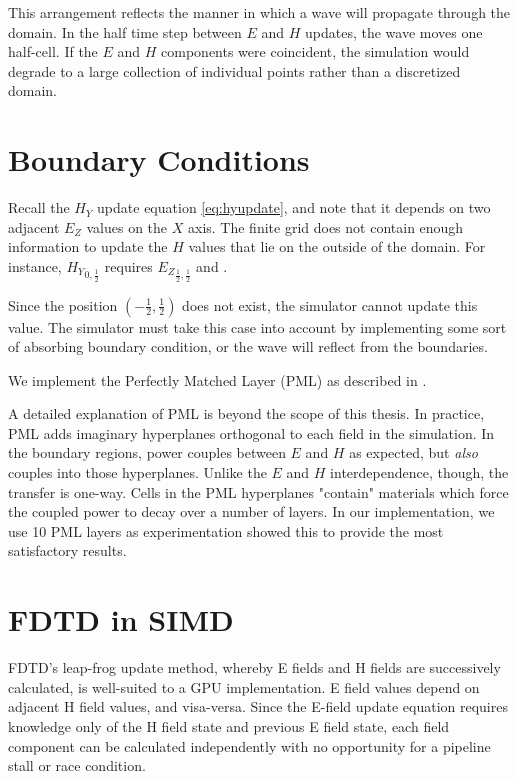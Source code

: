 This arrangement reflects the manner in which a wave will propagate through the domain. In the half time step between $E$ and $H$ updates, the wave moves one half-cell. If the $E$ and $H$ components were coincident, the simulation would degrade to a large collection of individual points rather than a discretized domain.


\section{Boundary Conditions}

Recall the $H_Y$ update equation \autoref{eq:hyupdate}, and note that it depends on two adjacent $E_Z$ values on the $X$ axis. The finite grid does not contain enough information to update the $H$ values that lie on the outside of the domain. For instance, ${H_Y}_{0,\frac{1}{2}}$ requires ${E_Z}_{\frac{1}{2},\frac{1}{2}}$ and .

Since the position $(-\frac{1}{2},\frac{1}{2})$ does not exist, the simulator cannot update this value. The simulator must take this case into account by implementing some sort of absorbing boundary condition, or the wave will reflect from the boundaries. 

We implement the Perfectly Matched Layer (PML) as described in \cite{BERENGER1994185}. 

A detailed explanation of PML is beyond the scope of this thesis. In practice, PML adds imaginary hyperplanes orthogonal to each field in the simulation. In the boundary regions, power couples between $E$ and $H$ as expected, but \emph{also} couples into those hyperplanes. Unlike the $E$ and $H$ interdependence, though, the transfer is one-way. Cells in the PML hyperplanes "contain" materials which force the coupled power to decay over a number of layers. In our implementation, we use 10 PML layers as experimentation showed this to provide the most satisfactory results.



\section{FDTD in SIMD}

FDTD's leap-frog update method, whereby E fields and H fields are successively calculated, is well-suited to a GPU implementation. E field values depend on adjacent H field values, and visa-versa. Since the E-field update equation requires knowledge only of the H field state and previous E field state, each field component can be calculated independently with no opportunity for a pipeline stall or race condition. 

